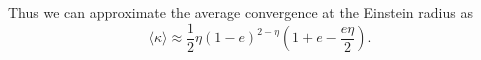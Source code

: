 Thus we can approximate the average convergence at the Einstein radius as 
\begin{equation}
\langle \kappa \rangle \approx \frac{1}{2} \eta  (1 - e)^{2 - \eta} \left(1 +  e - \frac{e \eta }{2}\right).
\end{equation}